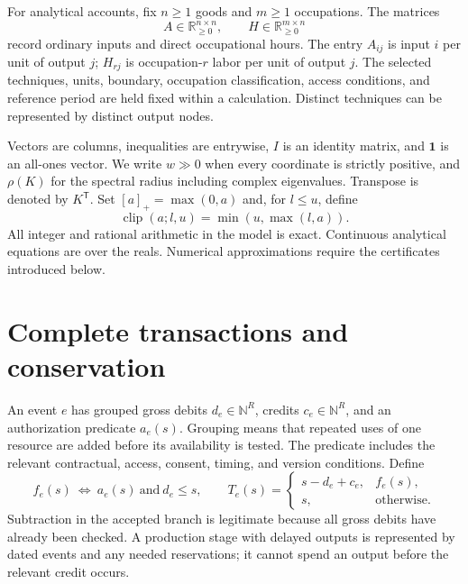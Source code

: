 \documentclass[11pt,a4paper]{article}
\begin{document}
For analytical accounts, fix $n\geq1$ goods and $m\geq1$ occupations. The matrices
\begin{equation}
A\in\mathbb R_{\geq0}^{n\times n},\qquad
H\in\mathbb R_{\geq0}^{m\times n}
\end{equation}
record ordinary inputs and direct occupational hours. The entry $A_{ij}$ is input $i$ per unit of output $j$; $H_{rj}$ is occupation-$r$ labor per unit of output $j$. The selected techniques, units, boundary, occupation classification, access conditions, and reference period are held fixed within a calculation. Distinct techniques can be represented by distinct output nodes.

Vectors are columns, inequalities are entrywise, $I$ is an identity matrix, and $\mathbf1$ is an all-ones vector. We write $w\gg0$ when every coordinate is strictly positive, and $\rho(K)$ for the spectral radius including complex eigenvalues. Transpose is denoted by $K^{\mathsf T}$. Set $[a]_+=\max(0,a)$ and, for $l\leq u$, define
\begin{equation}
\operatorname{clip}(a;l,u)=\min(u,\max(l,a)).
\end{equation}
All integer and rational arithmetic in the model is exact. Continuous analytical equations are over the reals. Numerical approximations require the certificates introduced below.

\section{Complete transactions and conservation}
An event $e$ has grouped gross debits $d_e\in\mathbb N^R$, credits $c_e\in\mathbb N^R$, and an authorization predicate $a_e(s)$. Grouping means that repeated uses of one resource are added before its availability is tested. The predicate includes the relevant contractual, access, consent, timing, and version conditions. Define
\begin{equation}
f_e(s)\ \Longleftrightarrow\ a_e(s)\ \text{and}\ d_e\leq s,
\qquad
T_e(s)=\begin{cases}s-d_e+c_e,&f_e(s),\\s,&\text{otherwise}.\end{cases}
\end{equation}
Subtraction in the accepted branch is legitimate because all gross debits have already been checked. A production stage with delayed outputs is represented by dated events and any needed reservations; it cannot spend an output before the relevant credit occurs.
\end{document}
